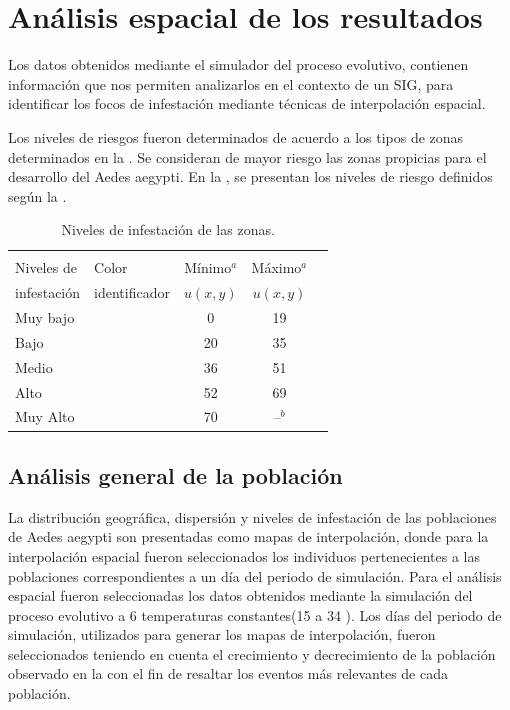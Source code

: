 \section {Análisis espacial de los resultados}
Los datos obtenidos mediante el simulador del proceso evolutivo, contienen información que nos
permiten analizarlos en el contexto de un SIG, para identificar los focos de infestación mediante
técnicas de interpolación espacial.

Los niveles de riesgos fueron determinados de acuerdo a los tipos de zonas determinados en la
. Se consideran de mayor riesgo las zonas propicias para el
desarrollo del Aedes aegypti. En la , se presentan los niveles de
riesgo definidos según la .


\begin{table}[!hptb]
    \begin{minipage}{\textwidth}
\begin{center}
    \caption{\label{tab:niveles-riesgo-zonas} Niveles de infestación de las zonas.}
    \begin{tabular}{p{3cm} l c c c}
        \hline \\
         Niveles de  & Color & Mínimo$^a$ & Máximo$^a$ \\
         infestación & identificador & $u(x,y)$   & $u(x,y)$  \\
        \hline
        \hline
        Muy bajo  & \cellcolor{muybajo}& 0  & 19 \\
        Bajo    & \cellcolor{bajo}& 20 & 35 \\
        Medio & \cellcolor{normal}& 36 & 51 \\
        Alto   & \cellcolor{alto}& 52 & 69 \\
        Muy Alto & \cellcolor{muyalto} & 70 & --$^b$\\
    \end{tabular}
\end{center}
    \end{minipage}
\end{table}

\subsection{Análisis general de la población}
La distribución geográfica, dispersión y niveles de infestación de las poblaciones de Aedes aegypti
son presentadas como mapas de interpolación, donde para la interpolación espacial fueron
seleccionados los individuos pertenecientes a las poblaciones correspondientes a un día del
periodo de simulación. Para el análisis espacial fueron seleccionadas los datos obtenidos mediante
la simulación del proceso evolutivo a 6 temperaturas constantes(15 a 34 \textcelsius). Los días
del periodo de simulación, utilizados para generar los mapas de interpolación, fueron
seleccionados teniendo en cuenta el crecimiento y decrecimiento de la población observado en
la  con el fin de resaltar los eventos más relevantes de cada
población.


